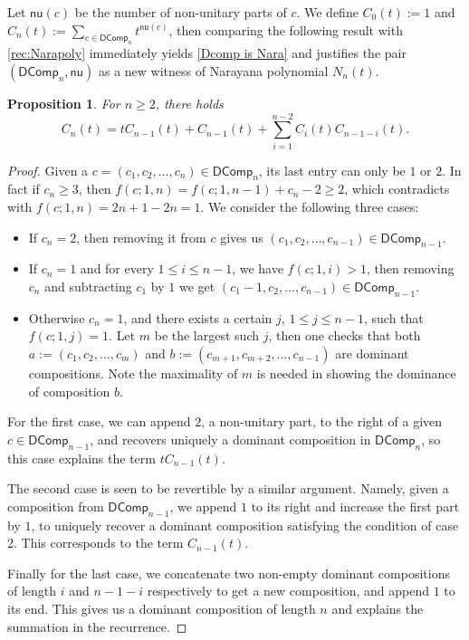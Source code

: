 \documentclass[reqno]{amsart}
\numberwithin{equation}{section}
\newtheorem{proposition}[theorem]{Proposition}
\theoremstyle{definition}
\theoremstyle{named}
\def\DComp{\mathsf{DComp}}
\def\nonu{\mathsf{nu}}
\begin{document}
Let $\nonu(c)$ be the number of non-unitary parts of $c$. We define $C_0(t):=1$ and $C_n(t):= {\textstyle \sum_{c\in \DComp_n}t^{\nonu(c)}}$, then comparing the following result with \eqref{rec:Narapoly} immediately yields \eqref{Dcomp is Nara} and justifies the pair $(\DComp_n ,\nonu)$ as a new witness of Narayana polynomial $N_n(t)$.
\begin{proposition}
	For $n\ge 2$, there holds $$C_n(t)=tC_{n-1}(t)+C_{n-1}(t)+\sum_{i=1}^{n-2}C_i(t)C_{n-1-i}(t).	$$
\end{proposition}
\begin{proof}
Given a $c=\left(c_1, c_2, \ldots, c_n\right)\in \DComp_{n}$, its last entry can only be $1$ or $2$. In fact if $c_n\ge 3$, then $f(c;1,n)=f(c;1,n-1)+c_n-2\ge 2$, which contradicts with $f(c;1,n)=2n+1-2n=1$. We consider the following three cases:
\begin{itemize}
\item If $c_n=2$, then removing it from $c$ gives us $(c_1, c_2, \ldots, c_{n-1})\in\DComp_{n-1}$.
\item If $c_n=1$ and for every $1\le i\le n-1$, we have $f(c;1,i)>1$, then removing $c_n$ and subtracting $c_1$ by $1$ we get $(c_1-1, c_2, \ldots, c_{n-1})\in\DComp_{n-1}$.
\item Otherwise $c_n=1$, and there exists a certain $j$, $1\le j\le n-1$, such that $f(c;1,j)=1$. Let $m$ be the largest such $j$, then one checks that both $a:=(c_1, c_2,\ldots, c_m)$ and $b:=(c_{m+1}, c_{m+2},\ldots, c_{n-1})$ are dominant compositions. Note the maximality of $m$ is needed in showing the dominance of composition $b$.
\end{itemize}

For the first case, we can append $2$, a non-unitary part, to the right of a given $c\in \DComp_{n-1}$, and recovers uniquely a dominant composition in $\DComp_n$, so this case explains the term $tC_{n-1}(t)$.
	
The second case is seen to be revertible by a similar argument. Namely, given a composition from $\DComp_{n-1}$, we append $1$ to its right and increase the first part by $1$, to uniquely recover a dominant composition satisfying the condition of case 2. This corresponds to the term $C_{n-1}(t)$.
	
Finally for the last case, we concatenate two non-empty dominant compositions of length $i$ and $n-1-i$ respectively to get a new composition, and append $1$ to its end. This gives us a dominant composition of length $n$ and explains the summation in the recurrence.
\end{proof}
\end{document}
